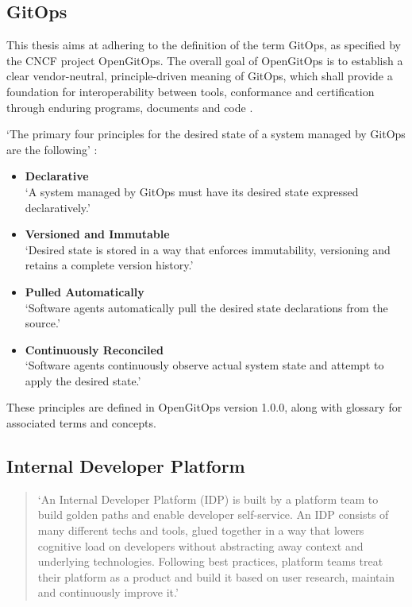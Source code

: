 \subsection*{GitOps}

This thesis aims at adhering to the definition of the term GitOps,
as specified by the CNCF project OpenGitOps.
The overall goal of OpenGitOps is to establish a clear vendor-neutral,
principle-driven meaning of GitOps,
which shall provide a foundation for interoperability between tools, conformance and certification through enduring programs, documents and code
\autocite{opengitopsDocuments}.

\noindent
\enquote*{The primary four principles
	for the desired state of a
	system managed by GitOps are the following} \autocite{gitopsPrinciplesv100}:

\begin{itemize}
	\item \textbf{Declarative} \\
	\enquote*{A system managed by GitOps must have its desired state expressed declaratively.}
	\item \textbf{Versioned and Immutable} \\
	\enquote*{Desired state is stored in a way that enforces immutability, versioning and retains a complete version history.}
	\item \textbf{Pulled Automatically} \\
	\enquote*{Software agents automatically pull the desired state declarations from the source.}
	\item \textbf{Continuously Reconciled} \\
	\enquote*{Software agents continuously observe actual system state and attempt to apply the desired state.}
	\autocite{gitopsPrinciplesv100}
\end{itemize}


These principles are defined in OpenGitOps version 1.0.0,
along with glossary
\autocite{gitopsGlossary}
for associated terms and concepts.

\subsection*{Internal Developer Platform}

\begin{quotation}
	\noindent
	\enquote*{An Internal Developer Platform (IDP) is built by a platform team to build golden paths and enable developer self-service. An IDP consists of many different techs and tools, glued together in a way that lowers cognitive load on developers without abstracting away context and underlying technologies. Following best practices, platform teams treat their platform as a product and build it based on user research, maintain and continuously improve it.}
	\autocite{internaldeveloperplatformWhatIsIDP}
\end{quotation}

